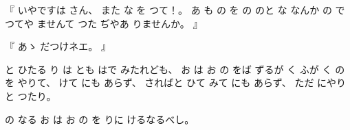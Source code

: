 
%
『
いやですは
さん、
%
また
な
を
つて！。
%
あ
も
の
を
の
のと
な
なんか
の
で
つてや
ませんて
つた
ぢやあ
りませんか。
』

%
『
あゝ
だつけネエ。
』

%
と
ひたる
り
は
とも
はで
みたれども、
%
お
は
お
の
をば
ずるが
く
ふが
く
の
を
やりて、
%
けて
にも
あらず、
%
さればと
ひて
みて
にも
あらず、
%
ただ%
にやりと
つたり。

%
の
なる
お
は
お
の
を
りに
けるなるべし。

